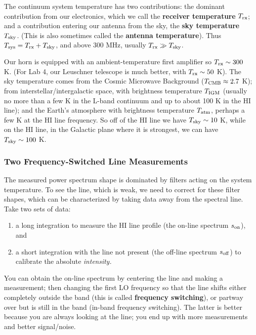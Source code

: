 \documentclass[11pt,preprint]{aastex}
\begin{document}
The continuum system temperature has two contributions: the dominant contribution
from our electronics, which we call the {\bf receiver temperature} $T_{\rm rx}$;
and a contribution entering our antenna from the sky, the {\bf sky temperature}
  $T_{\rm sky}$.  (This is also sometimes called the {\bf antenna temperature}).  
 Thus $T_{\rm sys}= T_{\rm rx} + T_{\rm sky}$, and above 300 MHz, usually $T_{\rm rx} \gg T_{\rm sky}$. 

Our horn is equipped with an ambient-temperature first amplifier so $T_{\rm rx} \sim
300$ K. (For Lab 4, our Leuschner telescope is much better, with $T_{\rm rx}
\sim 50$ K). The sky temperature comes from the Cosmic Microwave Background
($T_{\rm CMB}\approx 2.7$ K); from
interstellar/intergalactic space, with brightness temperature
$T_{\rm IGM}$ (usually no more than a few K in the L-band continuum and up to
about 100 K in the HI line); and the Earth's atmosphere with brightness
temperature $T_{\rm atm}$, perhaps a few K at the HI line frequency. So
off of the HI line we have $T_{\rm sky} \sim 10$ K, while on the HI line, in the
Galactic plane where it is strongest, we can have $T_{\rm sky} \sim 100$ K.

\subsubsection{Two Frequency-Switched Line Measurements}

\noindent
The measured power spectrum shape is dominated by
filters acting on the system temperature. To see the
line, which is weak, we need to correct for these filter shapes, which can
be characterized by taking data away from the spectral line.
Take two sets of data:
\begin{enumerate}
\item a long integration to measure the HI line profile (the on-line spectrum $s_{\rm on}$), and 
\item a short integration with the line not present (the off-line spectrum $s_{\rm off}$) to calibrate the absolute {\it intensity.}
\end{enumerate}

You can obtain the on-line
spectrum by centering the line and making a measurement; then changing
the first LO frequency so that the line shifts either completely
outside the band (this is called {\bf frequency switching}), or partway
over but is still in the band (in-band frequency
switching). The latter is better because you are always looking at
the line; you end up with more measurements and better signal/noise.
\end{document}

